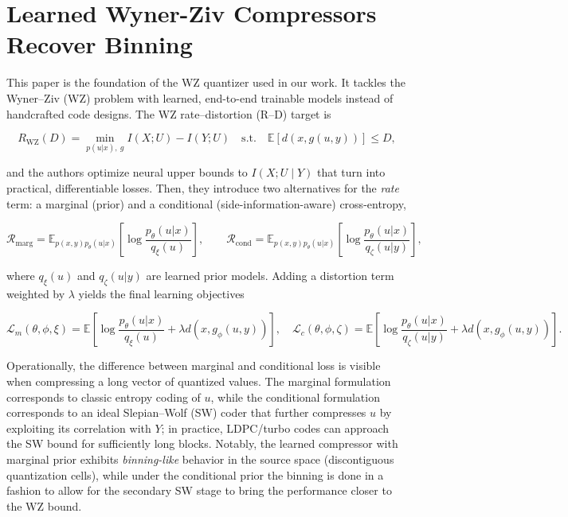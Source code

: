 \section{Learned Wyner-Ziv Compressors Recover Binning}
This paper \cite{OzyilkanRecoverBinning} is the foundation of the WZ quantizer used in our work. It tackles the Wyner–Ziv (WZ) problem with learned, end-to-end trainable models instead of handcrafted code designs. The WZ rate–distortion (R–D) target is

\begin{equation}
R_{\mathrm{WZ}}(D)=\min_{p(u|x),~g} I(X;U)-I(Y;U)\quad\text{s.t.}\quad \mathbb{E}[d(x,g(u,y))]\le D,
\end{equation}

and the authors optimize neural upper bounds to $I(X;U\mid Y)$ that turn into practical, differentiable losses. Then, they introduce two alternatives for the \emph{rate} term: a marginal (prior) and a conditional (side-information-aware) cross-entropy,

\begin{equation}
    \mathcal{R}_{\mathrm{marg}}=\mathbb{E}_{p(x,y)p_\theta(u|x)}\left[\log\frac{p_\theta(u|x)}{q_\xi(u)}\right],\qquad
    \mathcal{R}_{\mathrm{cond}}=\mathbb{E}_{p(x,y)p_\theta(u|x)}\left[\log\frac{p_\theta(u|x)}{q_\zeta(u|y)}\right],
\end{equation}

where $q_\xi(u)$ and $q_\zeta(u|y)$ are learned prior models. Adding a distortion term weighted by $\lambda$ yields the final learning objectives

\begin{equation}
    \mathcal{L}_m(\theta,\phi,\xi)=\mathbb{E}\left[\log\frac{p_\theta(u|x)}{q_\xi(u)}+\lambda d(x,g_\phi(u,y))\right],\quad
    \mathcal{L}_c(\theta,\phi,\zeta)=\mathbb{E}\left[\log\frac{p_\theta(u|x)}{q_\zeta(u|y)}+\lambda d(x,g_\phi(u,y))\right].
\end{equation}

Operationally, the difference between marginal and conditional loss is visible when compressing a long vector of quantized values. The marginal formulation corresponds to classic entropy coding of $u$, while the conditional formulation corresponds to an ideal Slepian–Wolf (SW) coder that further compresses $u$ by exploiting its correlation with $Y$; in practice, LDPC/turbo codes can approach the SW bound for sufficiently long blocks. Notably, the learned compressor with marginal prior exhibits \emph{binning-like} behavior in the source space (discontiguous quantization cells), while under the conditional prior the binning is done in a fashion to allow for the secondary SW stage to bring the performance closer to the WZ bound.


